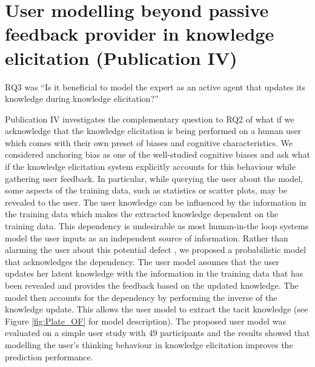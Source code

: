 \documentclass[dissertation,math,vertlayout,pdfa,colorlinks]{aaltoseries}
\begin{document}



\section{User modelling beyond passive feedback provider in knowledge elicitation (Publication IV)}

RQ3 was ``Is it beneficial to model the expert as an active agent that updates its knowledge during knowledge elicitation?''

Publication IV investigates the complementary question to RQ2 of what if we acknowledge that the knowledge elicitation is being performed on a human user which comes with their own preset of biases and cognitive characteristics. We considered anchoring bias as one of the well-studied cognitive biases \cite{Tversky1974} and ask what if the knowledge elicitation system explicitly accounts for this behaviour while gathering user feedback. In particular, while querying the user about the model, some aspects of the training data, such as statistics or scatter plots, may be revealed to the user. 
The user knowledge can be influenced by the information in the training data which makes the extracted knowledge dependent on the training data. This dependency is undesirable as most human-in-the loop systems model the user inputs as an independent source of information. Rather than alarming the user about this potential defect \cite{bias_warning}, we proposed a probabilistic model that acknowledges the dependency. The user model assumes that the user updates her latent knowledge with the information in the training data that has been revealed and provides the feedback based on the updated knowledge. The model then accounts for the dependency by performing the inverse of the knowledge update. This allows the user model to extract the tacit knowledge (see Figure \ref{fig:Plate_OF} for model description). The proposed user model was evaluated on a simple user study with 49 participants and the results showed that modelling the user's thinking behaviour in knowledge elicitation improves the prediction performance.
\end{document}
